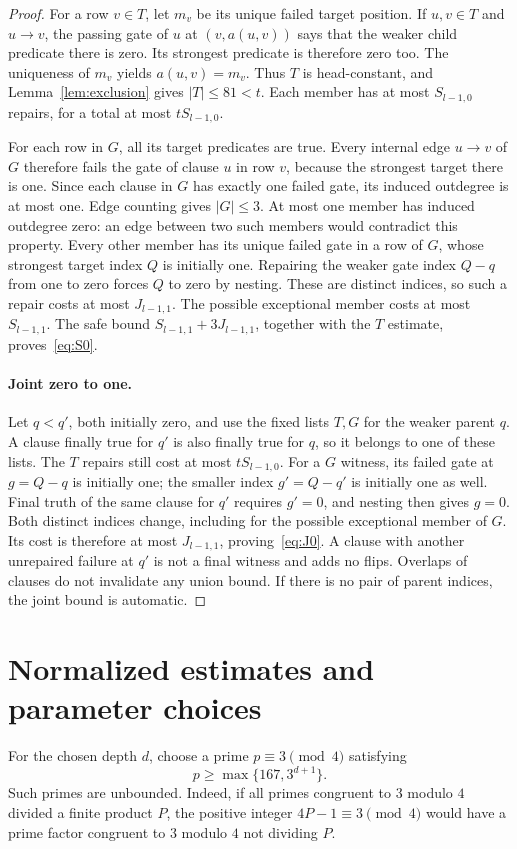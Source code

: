 \documentclass[11pt]{article}
\theoremstyle{definition}
\begin{document}
\begin{proof}
For a row $v\in T$, let $m_v$ be its unique failed target position. If $u,v\in T$ and $u\to v$, the passing gate of $u$ at $(v,a(u,v))$ says that the weaker child predicate there is zero. Its strongest predicate is therefore zero too. The uniqueness of $m_v$ yields $a(u,v)=m_v$. Thus $T$ is head-constant, and Lemma~\ref{lem:exclusion} gives $|T|\le81<t$. Each member has at most $S_{l-1,0}$ repairs, for a total at most $tS_{l-1,0}$.

For each row in $G$, all its target predicates are true. Every internal edge $u\to v$ of $G$ therefore fails the gate of clause $u$ in row $v$, because the strongest target there is one. Since each clause in $G$ has exactly one failed gate, its induced outdegree is at most one. Edge counting gives $|G|\le3$. At most one member has induced outdegree zero: an edge between two such members would contradict this property. Every other member has its unique failed gate in a row of $G$, whose strongest target index $Q$ is initially one. Repairing the weaker gate index $Q-q$ from one to zero forces $Q$ to zero by nesting. These are distinct indices, so such a repair costs at most $J_{l-1,1}$. The possible exceptional member costs at most $S_{l-1,1}$. The safe bound $S_{l-1,1}+3J_{l-1,1}$, together with the $T$ estimate, proves~\eqref{eq:S0}.

\paragraph{Joint zero to one.}
Let $q<q'$, both initially zero, and use the fixed lists $T,G$ for the weaker parent $q$. A clause finally true for $q'$ is also finally true for $q$, so it belongs to one of these lists. The $T$ repairs still cost at most $tS_{l-1,0}$. For a $G$ witness, its failed gate at $g=Q-q$ is initially one; the smaller index $g'=Q-q'$ is initially one as well. Final truth of the same clause for $q'$ requires $g'=0$, and nesting then gives $g=0$. Both distinct indices change, including for the possible exceptional member of $G$. Its cost is therefore at most $J_{l-1,1}$, proving~\eqref{eq:J0}. A clause with another unrepaired failure at $q'$ is not a final witness and adds no flips. Overlaps of clauses do not invalidate any union bound. If there is no pair of parent indices, the joint bound is automatic.
\end{proof}

\section{Normalized estimates and parameter choices}\label{sec:estimates}
For the chosen depth $d$, choose a prime $p\equiv3\pmod4$ satisfying
\begin{equation}\label{eq:prime}
 p\ge\max\{167,3^{d+1}\}.
\end{equation}
Such primes are unbounded. Indeed, if all primes congruent to $3$ modulo $4$ divided a finite product $P$, the positive integer $4P-1\equiv3\pmod4$ would have a prime factor congruent to $3$ modulo $4$ not dividing $P$.
\end{document}
